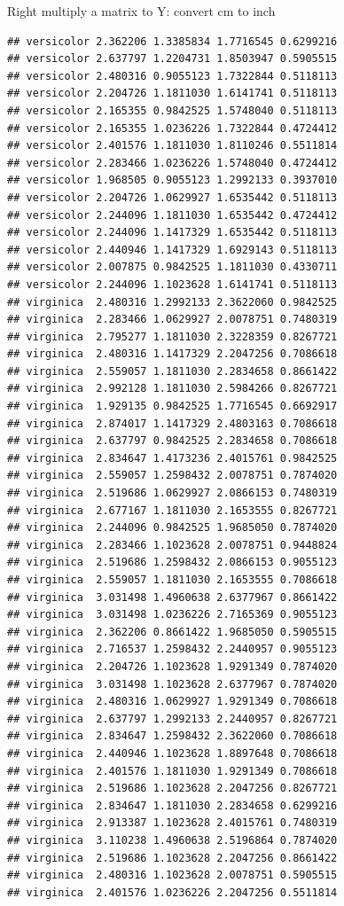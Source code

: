 \documentclass[
  ignorenonframetext,
]{beamer}
\begin{document}
\begin{frame}[fragile]{Right multiply a matrix to Y: convert cm to inch}
\begin{verbatim}
## versicolor 2.362206 1.3385834 1.7716545 0.6299216
## versicolor 2.637797 1.2204731 1.8503947 0.5905515
## versicolor 2.480316 0.9055123 1.7322844 0.5118113
## versicolor 2.204726 1.1811030 1.6141741 0.5118113
## versicolor 2.165355 0.9842525 1.5748040 0.5118113
## versicolor 2.165355 1.0236226 1.7322844 0.4724412
## versicolor 2.401576 1.1811030 1.8110246 0.5511814
## versicolor 2.283466 1.0236226 1.5748040 0.4724412
## versicolor 1.968505 0.9055123 1.2992133 0.3937010
## versicolor 2.204726 1.0629927 1.6535442 0.5118113
## versicolor 2.244096 1.1811030 1.6535442 0.4724412
## versicolor 2.244096 1.1417329 1.6535442 0.5118113
## versicolor 2.440946 1.1417329 1.6929143 0.5118113
## versicolor 2.007875 0.9842525 1.1811030 0.4330711
## versicolor 2.244096 1.1023628 1.6141741 0.5118113
## virginica  2.480316 1.2992133 2.3622060 0.9842525
## virginica  2.283466 1.0629927 2.0078751 0.7480319
## virginica  2.795277 1.1811030 2.3228359 0.8267721
## virginica  2.480316 1.1417329 2.2047256 0.7086618
## virginica  2.559057 1.1811030 2.2834658 0.8661422
## virginica  2.992128 1.1811030 2.5984266 0.8267721
## virginica  1.929135 0.9842525 1.7716545 0.6692917
## virginica  2.874017 1.1417329 2.4803163 0.7086618
## virginica  2.637797 0.9842525 2.2834658 0.7086618
## virginica  2.834647 1.4173236 2.4015761 0.9842525
## virginica  2.559057 1.2598432 2.0078751 0.7874020
## virginica  2.519686 1.0629927 2.0866153 0.7480319
## virginica  2.677167 1.1811030 2.1653555 0.8267721
## virginica  2.244096 0.9842525 1.9685050 0.7874020
## virginica  2.283466 1.1023628 2.0078751 0.9448824
## virginica  2.519686 1.2598432 2.0866153 0.9055123
## virginica  2.559057 1.1811030 2.1653555 0.7086618
## virginica  3.031498 1.4960638 2.6377967 0.8661422
## virginica  3.031498 1.0236226 2.7165369 0.9055123
## virginica  2.362206 0.8661422 1.9685050 0.5905515
## virginica  2.716537 1.2598432 2.2440957 0.9055123
## virginica  2.204726 1.1023628 1.9291349 0.7874020
## virginica  3.031498 1.1023628 2.6377967 0.7874020
## virginica  2.480316 1.0629927 1.9291349 0.7086618
## virginica  2.637797 1.2992133 2.2440957 0.8267721
## virginica  2.834647 1.2598432 2.3622060 0.7086618
## virginica  2.440946 1.1023628 1.8897648 0.7086618
## virginica  2.401576 1.1811030 1.9291349 0.7086618
## virginica  2.519686 1.1023628 2.2047256 0.8267721
## virginica  2.834647 1.1811030 2.2834658 0.6299216
## virginica  2.913387 1.1023628 2.4015761 0.7480319
## virginica  3.110238 1.4960638 2.5196864 0.7874020
## virginica  2.519686 1.1023628 2.2047256 0.8661422
## virginica  2.480316 1.1023628 2.0078751 0.5905515
## virginica  2.401576 1.0236226 2.2047256 0.5511814

\end{verbatim}
\end{frame}
\end{document}
